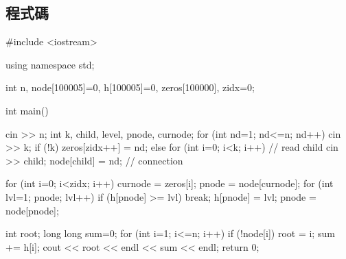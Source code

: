 \subsection{程式碼}
\begin{cppcode}
#include <iostream>

using namespace std;

int n, node[100005]={0}, h[100005]={0}, zeros[100000], zidx=0;

int main()
{
	cin >> n;
	int k, child, level, pnode, curnode;
	for (int nd=1; nd<=n; nd++) {
		cin >> k;
		if (!k) zeros[zidx++] = nd;
		else for (int i=0; i<k; i++) { // read child
			cin >> child;
			node[child] = nd; // connection
		}
	}
	
	for (int i=0; i<zidx; i++) {
		curnode = zeros[i];
		pnode = node[curnode];
		for (int lvl=1; pnode; lvl++) {
			if (h[pnode] >= lvl) break;
			h[pnode] = lvl;
			pnode = node[pnode];
		}
	}
	
	int root;
	long long sum=0;
	for (int i=1; i<=n; i++) {
		if (!node[i]) root = i;
		sum += h[i];
	}
	cout << root << endl << sum << endl;
	return 0;
}
\end{cppcode}